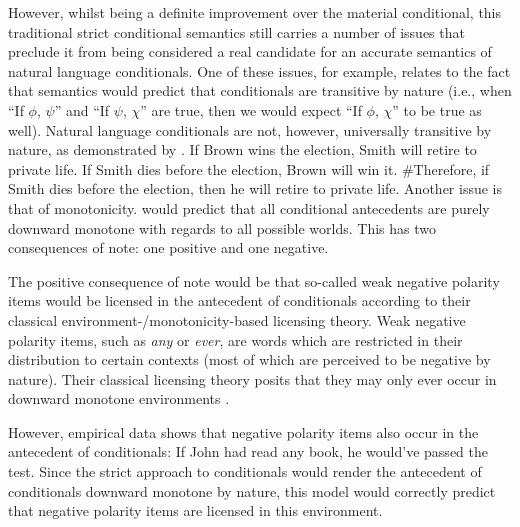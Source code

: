 However, whilst being a definite improvement over the material conditional, this traditional strict conditional semantics still carries a number of issues that preclude it from being considered a real candidate for an accurate semantics of natural language conditionals. One of these issues, for example, relates to the fact that  semantics would predict that conditionals are transitive by nature (i.e., when \enquote{If $\phi$, $\psi$} and \enquote{If $\psi$, $\chi$} are true, then we would expect \enquote{If $\phi$, $\chi$} to be true as well). Natural language conditionals are not, however, universally transitive by nature, as demonstrated by .
\ex{}
If Brown wins the election, Smith will retire to private life. If Smith dies before the election, Brown will win it. \#Therefore, if Smith dies before the election, then he will retire to private life.\hfill\parencite[p.~166]{Adams1965}
\xe
Another issue is that of monotonicity. \textcite{Lewis1912,Lewis1914,Lewis1918} would predict that all conditional antecedents are purely downward monotone with regards to all possible worlds. This has two consequences of note: one positive and one negative. 

The positive consequence of note would be that so-called weak negative polarity items would be licensed in the antecedent of conditionals according to their classical environment-/monotonicity-based licensing theory. Weak negative polarity items, such as \textit{any} or \textit{ever}, are words which are restricted in their distribution to certain contexts (most of which are perceived to be negative by nature). Their classical licensing theory posits that they may only ever occur in downward monotone environments \parencite{Ladusaw1980,Fauconnier1975a,Fauconnier1975b}. 
\ex{}\label{def:dm-intro}%

\xe
However, empirical data shows that negative polarity items also occur in the antecedent of conditionals:
\ex{}
If John had read any book, he would've passed the test.
\xe
Since the strict approach to conditionals would render the antecedent of conditionals downward monotone by nature, this model would correctly predict that negative polarity items are licensed in this environment.

